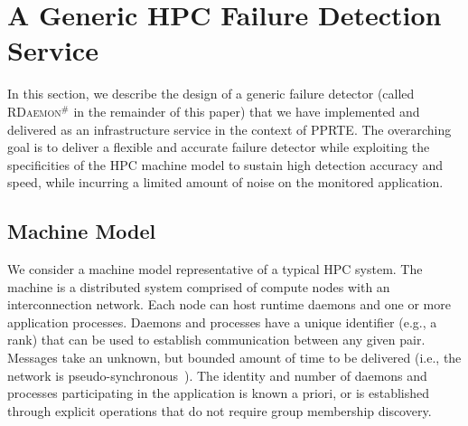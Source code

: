 \documentclass[5p,times,twocolumn]{elsarticle}
\newcommand{\ourwork}[0]{\textsc{RDaemon}\ensuremath{^\#}\xspace}
\begin{document}
%


\section{A Generic HPC Failure Detection Service}\label{sec:design}

In this section, we describe the design of a generic failure detector (called
\ourwork in the remainder of this paper) that we have implemented and delivered
as an infrastructure service in the context of PPRTE. The overarching goal is to
deliver a flexible and accurate failure detector while exploiting the
specificities of the HPC machine model to sustain high detection accuracy and
speed, while incurring a limited amount of noise on the monitored application.

\subsection{Machine Model}

We consider a machine model representative of a typical HPC system.
The machine is a distributed system comprised of compute nodes with an
interconnection network. Each
node can host runtime daemons and one or more application processes. Daemons
and processes have a unique identifier (e.g., a rank) that can be used
to establish communication between any given pair. Messages take an unknown,
but bounded amount of time to be delivered (i.e., the network is pseudo-synchronous~\cite{Chandra96}).
 The identity and number of daemons and processes participating in the application is known a priori,
or is established through explicit operations that do not require group
membership discovery.
\end{document}
